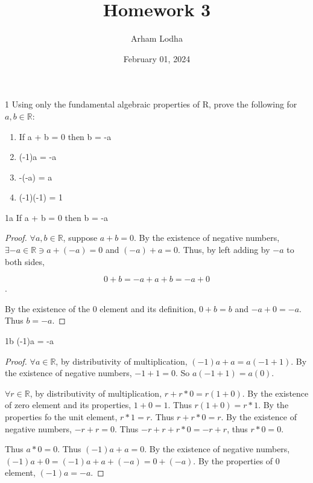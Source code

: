 \documentclass{article}
\newcommand{\R}{\mathbb{R}}
\begin{document}
\title{Homework 3}
\author{Arham Lodha}%
\date{February 01, 2024}%
\maketitle

\begin{PROB}{1}\label{Problem 1.}
    Using only the fundamental algebraic properties of R, prove the following for $a, b \in \R$:

    \begin{enumerate}
        \item If a + b = 0 then b = -a
        \item (-1)a = -a
        \item -(-a) = a
        \item (-1)(-1) = 1
    \end{enumerate}
\end{PROB}
\begin{claim}{1a}\label{Claim 1a.}
    If a + b = 0 then b = -a
\end{claim}
\begin{proof}
    $\forall a, b \in \R$, suppose $a + b = 0$. By the existence of negative numbers, $\exists -a \in \R \ni a + (-a) = 0$ and $(-a) + a = 0$. Thus, by left adding by $-a$ to both sides,   
    
    \[
    0 + b = -a + a + b = -a + 0
    \].

    By the existence of the 0 element and its definition, $0 + b = b$ and $-a + 0 = -a$. Thus $b = -a$.   
\end{proof}
\begin{claim}{1b}\label{Claim 1b.}
    (-1)a = -a
\end{claim}
\begin{proof}
    $\forall a \in \R$, by distributivity of multiplication, $(-1)a + a = a(-1 + 1)$. By the existence of negative numbers, $-1 + 1 = 0$. So $a(-1 + 1) = a(0)$. 
    
    $\forall r \in \R$, by distributivity of multiplication, $r + r*0 = r(1 + 0)$. By the existence of zero element and its properties, $1 + 0 = 1$. Thus $r(1 + 0) = r*1$. By the properties fo the unit element, $r * 1 = r$. Thus $r + r*0 = r$. By the existence of negative numbers, $-r + r = 0$. Thus $-r + r + r*0 = -r + r$, thus $r*0 = 0$. 
    
    Thus $a*0 = 0$. Thus $(-1)a + a = 0$. By the existence of negative numbers, $(-1)a + 0 = (-1)a + a + (-a) = 0 + (-a)$. By the properties of $0$ element, $(-1)a = -a$.     
\end{proof}
\end{document}
